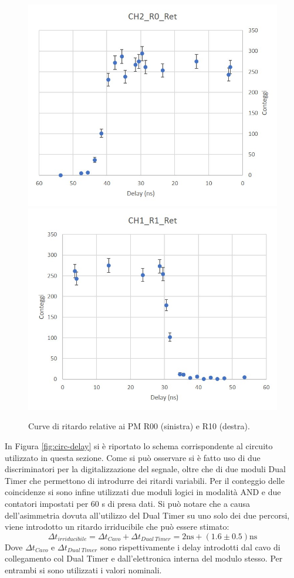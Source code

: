 \documentclass{standalone}
\begin{document}
	\begin{figure}[h]

		\includegraphics[width=.5\textwidth]{excel-plots/R00-delay-flipped.jpg}\quad\includegraphics[width=.5\textwidth]{excel-plots/R01-delay.jpg}
    \caption{Curve di ritardo relative ai PM R00 (sinistra) e R10 (destra).}
		\label{fig:delay}
	\end{figure}


	In Figura \ref{fig:circ-delay} si \`e riportato lo schema corrispondente al circuito utilizzato in questa sezione. Come si pu\`o osservare si \`e fatto uso di due discriminatori per la digitalizzazione del segnale, oltre che di due moduli Dual Timer che permettono di introdurre dei ritardi variabili. Per il conteggio delle coincidenze si sono infine utilizzati due moduli logici in modalit\`a AND e due contatori impostati per 60 s di presa dati. Si pu\`o notare che a causa dell'asimmetria dovuta all'utilizzo del Dual Timer su uno solo dei due percorsi, viene introdotto un ritardo irriducibile che pu\`o essere stimato:
	\begin{equation}
    \Delta t_{irriducibile}=\Delta t_{Cavo}+\Delta t_{Dual\ Timer}=2\text{ns}+(1.6\pm 0.5)\text{ns}
	\end{equation}
	Dove $\Delta t_{Cavo}$ e $\Delta t_{Dual\ Timer}$  sono rispettivamente i delay introdotti dal cavo di collegamento col Dual Timer e  dall'elettronica interna del modulo stesso. Per entrambi si sono utilizzati i valori nominali.
\end{document}
